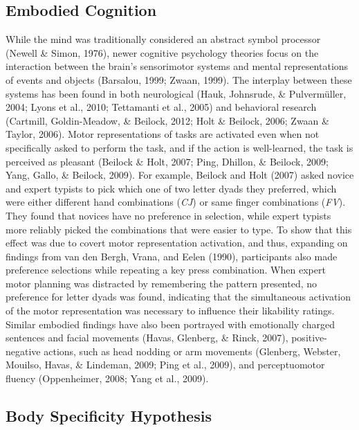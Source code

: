 \documentclass[english,man]{apa6}
\theoremstyle{definition}
\theoremstyle{definition}
\theoremstyle{definition}
\theoremstyle{remark}
\begin{document}
\subsection{Embodied Cognition}\label{embodied-cognition}

While the mind was traditionally considered an abstract symbol processor
(Newell \& Simon, 1976), newer cognitive psychology theories focus on
the interaction between the brain's sensorimotor systems and mental
representations of events and objects (Barsalou, 1999; Zwaan, 1999). The
interplay between these systems has been found in both neurological
(Hauk, Johnsrude, \& Pulvermüller, 2004; Lyons et al., 2010; Tettamanti
et al., 2005) and behavioral research (Cartmill, Goldin-Meadow, \&
Beilock, 2012; Holt \& Beilock, 2006; Zwaan \& Taylor, 2006). Motor
representations of tasks are activated even when not specifically asked
to perform the task, and if the action is well-learned, the task is
perceived as pleasant (Beilock \& Holt, 2007; Ping, Dhillon, \& Beilock,
2009; Yang, Gallo, \& Beilock, 2009). For example, Beilock and Holt
(2007) asked novice and expert typists to pick which one of two letter
dyads they preferred, which were either different hand combinations
(\emph{CJ}) or same finger combinations (\emph{FV}). They found that
novices have no preference in selection, while expert typists more
reliably picked the combinations that were easier to type. To show that
this effect was due to covert motor representation activation, and thus,
expanding on findings from van den Bergh, Vrana, and Eelen (1990),
participants also made preference selections while repeating a key press
combination. When expert motor planning was distracted by remembering
the pattern presented, no preference for letter dyads was found,
indicating that the simultaneous activation of the motor representation
was necessary to influence their likability ratings. Similar embodied
findings have also been portrayed with emotionally charged sentences and
facial movements (Havas, Glenberg, \& Rinck, 2007), positive-negative
actions, such as head nodding or arm movements (Glenberg, Webster,
Mouilso, Havas, \& Lindeman, 2009; Ping et al., 2009), and
perceptuomotor fluency (Oppenheimer, 2008; Yang et al., 2009).

\subsection{Body Specificity
Hypothesis}\label{body-specificity-hypothesis}
\end{document}
